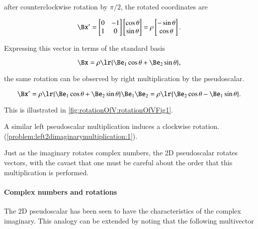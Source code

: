 after counterclockwise rotation by \( \pi/2 \), the rotated coordinates are

\begin{dmath}\label{eqn:SimpleProducts2:260}
\Bx'
=
\begin{bmatrix}
   0 & -1 \\
   1 & 0 \\
\end{bmatrix}
\begin{bmatrix}
   \cos\theta \\
   \sin\theta \\
\end{bmatrix}
=
\rho
\begin{bmatrix}
   -\sin\theta \\
   \cos\theta
\end{bmatrix}.
\end{dmath}

Expressing this vector in terms of the standard basis

\begin{dmath}\label{eqn:SimpleProducts2:280}
   \Bx = \rho \lr{ \Be_1 \cos\theta + \Be_2 \sin\theta },
\end{dmath}

the same rotation can be observed by right multiplication by the pseudoscalar.

\begin{dmath}\label{eqn:SimpleProducts2:300}
\Bx'
= \rho \lr{ \Be_1 \cos\theta + \Be_2 \sin\theta } \Be_1 \Be_2
= \rho \lr{ \Be_2 \cos\theta - \Be_1 \sin\theta }.
\end{dmath}

This is illustrated in \cref{fig:rotationOfV:rotationOfVFig1}.

A similar left pseudoscalar multiplication induces a clockwise rotation.
(\cref{problem:left2dimaginarymultiplication:1}).

Just as the imaginary rotates complex numbers, the 2D pseudoscalar rotates vectors, with the cavaet that one must be careful about the order that this multiplication is performed.

\paragraph{Complex numbers and rotations}

The 2D pseudoscalar has been seen to have the characteristics of the complex imaginary.  This analogy can be extended by noting that the following multivector

